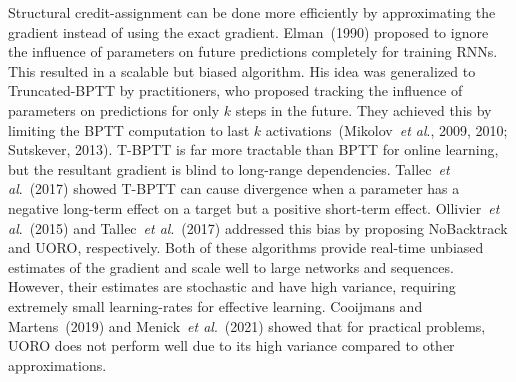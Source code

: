 \documentclass{article}
\newcommand{\etal}{\textit{et al}.}
\begin{document}
 

Structural credit-assignment can be done more efficiently by approximating the gradient instead of using the exact gradient. Elman~(1990) proposed to ignore the influence of parameters on future predictions completely for training RNNs. This resulted in a scalable but biased algorithm. His idea was generalized to Truncated-BPTT by practitioners, who proposed tracking the influence of parameters on predictions for only $k$ steps in the future. They achieved this by limiting the BPTT computation to last $k$ activations~(Mikolov~\etal, 2009, 2010; Sutskever, 2013). T-BPTT is far more tractable than BPTT for online learning, but the resultant gradient is blind to long-range dependencies. Tallec~\etal~(2017) showed T-BPTT can cause divergence when a parameter has a negative long-term effect on a target but a positive short-term effect. Ollivier~\etal~(2015) and Tallec~\etal~(2017) addressed this bias by proposing NoBacktrack and UORO, respectively. Both of these algorithms provide real-time unbiased estimates of the gradient and scale well to large networks and sequences. However, their estimates are stochastic and have high variance, requiring extremely small learning-rates for effective learning. Cooijmans and Martens~(2019) and Menick~\etal~(2021) showed that for practical problems, UORO does not perform well due to its high variance compared to other approximations.
\end{document}
